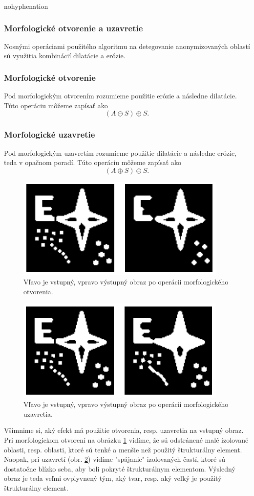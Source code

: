 \begin{hyphenrules}{nohyphenation}
\subsubsection{Morfologické otvorenie a uzavretie}
Nosnými operáciami použitého algoritmu na detegovanie anonymizovaných oblastí sú využitia kombinácií dilatácie a erózie. 
\subsubsection{Morfologické otvorenie}
    
    Pod morfologickým otvorením rozumieme použitie erózie a následne dilatácie. Túto operáciu môžeme zapísať ako
    \[(A\ominus S) \oplus S. \]
    
\subsubsection{Morfologické uzavretie}
    
    Pod morfologickým uzavretím rozumieme použitie dilatácie a následne erózie, teda v opačnom poradí. Túto operáciu môžeme zapísať ako
    \[(A\oplus S) \ominus S. \]
    
\begin{figure}[H]
    \centering
    \includegraphics[width=0.5\linewidth]{img/otvorenie.png}
    \caption{Vľavo je vstupný, vpravo výstupný obraz po operácii morfologického otvorenia.}
    \label{fig:open}
\end{figure}
\begin{figure}[H]
    \centering
    \includegraphics[width=0.5\linewidth]{img/uzavretie.png}
    \caption{Vľavo je vstupný, vpravo výstupný obraz po operácii morfologického uzavretia.}
    \label{fig:close}
\end{figure}
Všimnime si, aký efekt má použitie otvorenia, resp. uzavretia na vstupný obraz. Pri morfologickom otvorení na obrázku \ref{fig:open} vidíme, že sú odstránené malé izolované oblasti, resp. oblasti, ktoré sú tenké a menšie než použitý štrukturálny element. Naopak, pri uzavretí (obr. \ref{fig:close}) vidíme "spájanie" izolovaných častí, ktoré sú dostatočne blízko seba, aby boli pokryté štrukturálnym elementom. Výsledný obraz je teda veľmi ovplyvnený tým, aký tvar, resp. aký veľký je použitý štrukturálny element. 


\end{hyphenrules}
